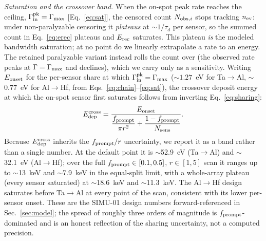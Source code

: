 \emph{Saturation and the crossover band.} When the on-spot peak rate reaches the ceiling, $\Gamma_{\rm in}^{\rm pk}=\Gamma_{\rm max}$ [Eq.~\eqref{eq:sat}], the censored count $N_{{\rm obs},i}$ stops tracking $n_{\rm ev}$: under non-paralyzable censoring it \emph{plateaus} at $\sim$$1/\tau_d$ per sensor, so the summed count in Eq.~\eqref{eq:erec} plateaus and $E_{\rm rec}$ saturates. This plateau \emph{is} the modeled bandwidth saturation; at no point do we linearly extrapolate a rate to an energy. The retained paralyzable variant instead rolls the count over (the observed rate peaks at $\Gamma=\Gamma_{\rm max}$ and declines), which we carry only as a sensitivity. Writing $E_{\rm onset}$ for the per-sensor share at which $\Gamma_{\rm in}^{\rm pk}=\Gamma_{\rm max}$ ($\sim$$1.27$~eV for Ta$\to$Al, $\sim$$0.77$~eV for Al$\to$Hf, from Eqs.~\eqref{eq:chain}--\eqref{eq:sat}), the crossover deposit energy at which the on-spot sensor first saturates follows from inverting Eq.~\eqref{eq:sharing}:
\begin{equation}
E_{\rm dep}^{\rm cross}=\frac{E_{\rm onset}}
{\dfrac{f_{\rm prompt}}{\pi r^2}+\dfrac{1-f_{\rm prompt}}{N_{\rm sens}}} .
\label{eq:crossover}
\end{equation}
Because $E_{\rm dep}^{\rm cross}$ inherits the $f_{\rm prompt}/r$ uncertainty, we report it as a band rather than a single number. At the default point it is $\sim$52.9~eV (Ta$\to$Al) and $\sim$32.1~eV (Al$\to$Hf); over the full $f_{\rm prompt}\in[0.1,0.5]$, $r\in[1,5]$ scan it ranges up to $\sim$13~keV and $\sim$7.9~keV in the equal-split limit, with a whole-array plateau (every sensor saturated) at $\sim$18.6~keV and $\sim$11.3~keV. The Al$\to$Hf design saturates before Ta$\to$Al at every point of the scan, consistent with its lower per-sensor onset. These are the SIMU-01 design numbers forward-referenced in Sec.~\ref{sec:model}; the spread of roughly three orders of magnitude is $f_{\rm prompt}$-dominated and is an honest reflection of the sharing uncertainty, not a computed precision.

